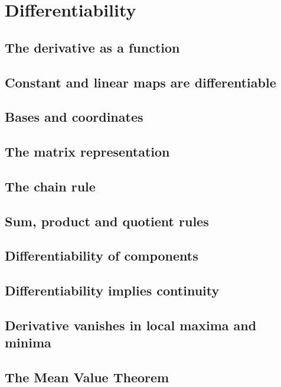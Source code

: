\section{Differentiability}

\subsection{The derivative as a function}

\subsection{Constant and linear maps are differentiable}

\subsection{Bases and coordinates}

\subsection{The matrix representation}

\subsection{The chain rule}

\subsection{Sum, product and quotient rules}

\subsection{Differentiability of components}

\subsection{Differentiability implies continuity}

\subsection{Derivative vanishes in local maxima and minima}

\subsection{The Mean Value Theorem}

